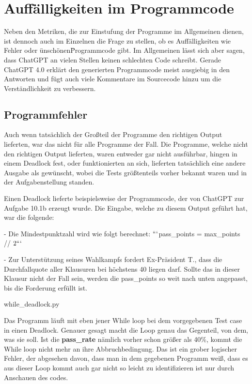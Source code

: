 \documentclass[class=scrbook, crop=false]{standalone}
\begin{document}
\chapter{Auffälligkeiten im Programmcode}
\label{ch::Auffaelligkeiten_im_Programmcode}
    Neben den Metriken, die zur Einstufung der Programme im Allgemeinen dienen, ist dennoch auch im Einzelnen die Frage zu stellen,
    ob es Auffälligkeiten wie Fehler oder \"unschönen\" Programmcode gibt.
    Im Allgemeinen lässt sich aber sagen, dass ChatGPT an vielen Stellen keinen schlechten Code schreibt.
    Gerade ChatGPT 4.0 erklärt den generierten Programmcode meist ausgiebig in den Antworten und fügt auch viele
    Kommentare im Sourcecode hinzu um die Verständlichkeit zu verbessern.

\section{Programmfehler}
\label{sec:programmfehler}
    Auch wenn tatsächlich der Großteil der Programme den richtigen Output lieferten, war das nicht für alle Programme der Fall.
    Die Programme, welche nicht den richtigen Output lieferten, waren entweder gar nicht ausführbar, hingen in einem Deadlock fest, oder funktionierten an sich,
    lieferten tatsächlich eine andere Ausgabe als gewünscht, wobei die Tests größtenteils vorher bekannt waren und in der Aufgabenstellung standen.

    Einen Deadlock lieferte beispielsweise der Programmcode, der von ChatGPT zur Aufgabe 10.1b erzeugt wurde.
    Die Eingabe, welche zu diesem Output geführt hat, war die folgende:
    \begin{displayquote}
        - Die Mindestpunktzahl wird wie folgt berechnet: \(```\)pass\_points = max\_points // \(2```\)

        - Zur Unterstützung seines Wahlkampfs fordert Ex-Präsident T., dass die Durchfallquote aller Klausuren bei höchstens 40%
        liegen darf. Sollte das in dieser Klausur nicht der Fall sein, werden die pass\_points so weit nach unten angepasst,
        bis die Forderung erfüllt ist.
    \end{displayquote}
    
    {while_deadlock.py}

    Das Programm läuft mit eben jener While loop bei dem vorgegebenen Test case in einen Deadlock.
    Genauer gesagt macht die Loop genau das Gegenteil, von dem, was sie soll.
    Ist die \textbf{pass\_rate} nämlich vorher schon größer als 40\%, kommt die While loop nicht mehr an ihre Abbruchbedingung.
    Das ist ein grober logischer Fehler, der abgesehen davon, dass man in dem gegebenen Programm weiß, dass es aus dieser
    Loop kommt auch gar nicht so leicht zu identifizieren ist nur durch Anschauen des codes.
\end{document}
